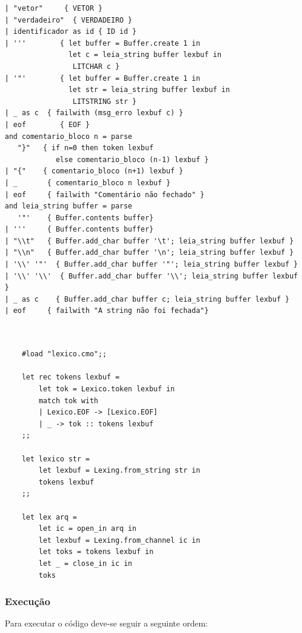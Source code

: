 \documentclass[hidelinks,12pt]{article}
\begin{document}
\begin{lstlisting}[caption=lexico.mll, style=OcamlStyle ]
| "vetor"     { VETOR }
| "verdadeiro"  { VERDADEIRO }
| identificador as id { ID id }
| '''        { let buffer = Buffer.create 1 in 
               let c = leia_string buffer lexbuf in
                LITCHAR c }
| '"'        { let buffer = Buffer.create 1 in 
               let str = leia_string buffer lexbuf in
                LITSTRING str }
| _ as c  { failwith (msg_erro lexbuf c) }
| eof        { EOF }
and comentario_bloco n = parse
   "}"   { if n=0 then token lexbuf 
            else comentario_bloco (n-1) lexbuf }
| "{"    { comentario_bloco (n+1) lexbuf }
| _       { comentario_bloco n lexbuf }
| eof     { failwith "Comentário não fechado" }
and leia_string buffer = parse
   '"'    { Buffer.contents buffer}
| '''     { Buffer.contents buffer}
| "\\t"   { Buffer.add_char buffer '\t'; leia_string buffer lexbuf }
| "\\n"   { Buffer.add_char buffer '\n'; leia_string buffer lexbuf }
| '\\' '"'  { Buffer.add_char buffer '"'; leia_string buffer lexbuf }
| '\\' '\\'  { Buffer.add_char buffer '\\'; leia_string buffer lexbuf }
| _ as c    { Buffer.add_char buffer c; leia_string buffer lexbuf }
| eof     { failwith "A string não foi fechada"}


	\end{lstlisting}
	
	\begin{lstlisting}[style=OcamlStyle, caption=carregador.ml]
	
	#load "lexico.cmo";;

	let rec tokens lexbuf =
  		let tok = Lexico.token lexbuf in
  		match tok with
  		| Lexico.EOF -> [Lexico.EOF]
  		| _ -> tok :: tokens lexbuf
	;;

	let lexico str =
  		let lexbuf = Lexing.from_string str in
  		tokens lexbuf
	;;

	let lex arq =
  		let ic = open_in arq in
  		let lexbuf = Lexing.from_channel ic in
  		let toks = tokens lexbuf in
  		let _ = close_in ic in
  		toks
	\end{lstlisting}
	\subsubsection{Execução}
	
	Para executar o código deve-se seguir a seguinte ordem:
	
\end{document}
